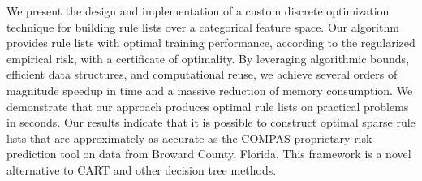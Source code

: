 We present the design and implementation of a custom discrete optimization
technique for building rule lists over a categorical feature space.
%
Our algorithm provides rule lists with optimal training performance,
according to the regularized empirical risk, with a certificate of optimality.
%
By leveraging algorithmic bounds, efficient data structures,
and computational reuse, we achieve several orders of magnitude speedup in time
and a massive reduction of memory consumption.
%
We demonstrate that our approach produces optimal rule lists on practical
problems in seconds.
%
Our results indicate that it is possible to construct optimal sparse rule lists that are
approximately as accurate as the COMPAS proprietary risk prediction tool on data from
Broward County, Florida.
%
This framework is a novel alternative to CART and other decision tree methods.
